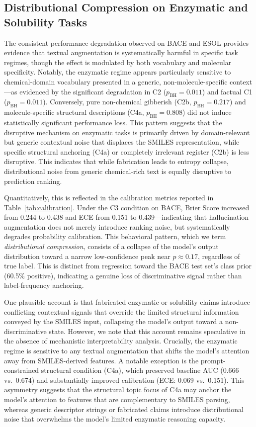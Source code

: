 \subsection{Distributional Compression on Enzymatic and 
Solubility Tasks}
The consistent performance degradation observed on BACE and ESOL provides evidence that textual augmentation is systematically harmful in specific task regimes, though the effect is modulated by both vocabulary and molecular specificity. Notably, the enzymatic regime appears particularly sensitive to chemical-domain vocabulary presented in a generic, non-molecule-specific context---as evidenced by the significant degradation in C2 ($p_{\text{BH}}=0.011$) and factual C1 ($p_{\text{BH}}=0.011$). Conversely, pure non-chemical gibberish (C2b, $p_{\text{BH}}=0.217$) and molecule-specific structural descriptions (C4a, $p_{\text{BH}}=0.808$) did not induce statistically significant performance loss. This pattern suggests that the disruptive mechanism on enzymatic tasks is primarily driven by domain-relevant but generic contextual noise that displaces the SMILES representation, while specific structural anchoring (C4a) or completely irrelevant register (C2b) is less disruptive. This indicates that while fabrication leads to entropy collapse, distributional noise from generic chemical-rich text is equally disruptive to prediction ranking.

Quantitatively, this is reflected in the calibration metrics 
reported in Table~\ref{tab:calibration}. Under the C3 
condition on BACE, Brier Score increased from 0.244 to 0.438 
and ECE from 0.151 to 0.439---indicating that hallucination 
augmentation does not merely introduce ranking noise, but 
systematically degrades probability calibration. This 
behavioral pattern, which we term \textit{distributional 
compression}, consists of a collapse of the model's output 
distribution toward a narrow low-confidence peak near 
$p \approx 0.17$, regardless of true label. This is distinct 
from regression toward the BACE test set's class prior 
(60.5\% positive), indicating a genuine loss of 
discriminative signal rather than label-frequency anchoring.

One plausible account is that fabricated enzymatic or solubility claims introduce conflicting contextual signals that override the limited structural information conveyed by the SMILES input, collapsing the model's output toward a non-discriminative state. However, we note that this account remains speculative in the absence of mechanistic interpretability analysis. Crucially, the enzymatic regime is sensitive to any textual augmentation that shifts the model's attention away from SMILES-derived features. A notable exception is the prompt-constrained structural condition (C4a), which preserved baseline AUC (0.666 vs.\ 0.674) and substantially improved calibration (ECE: 0.069 vs.\ 0.151). This asymmetry suggests that the structural topic focus of C4a may anchor the model's attention to features that are complementary to SMILES parsing, whereas generic descriptor strings or fabricated claims introduce distributional noise that overwhelms the model's limited enzymatic reasoning capacity.


